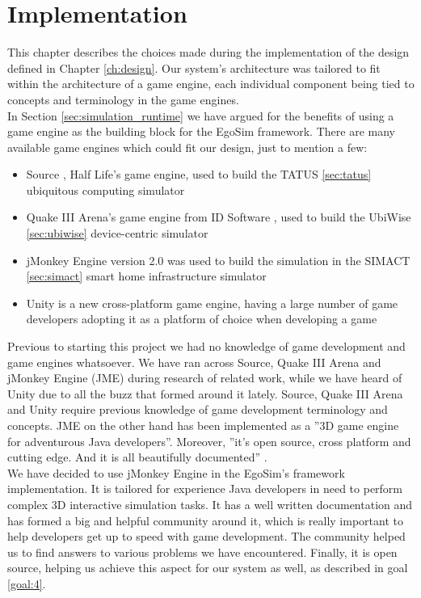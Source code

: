 \chapter{Implementation}\label{ch:implementation}
This chapter describes the choices made during the implementation of the design defined in Chapter \ref{ch:design}. Our system's architecture was tailored to fit within the architecture of a game engine, each individual component being tied to concepts and terminology in the game engines.\\ 

In Section \ref{sec:simulation_runtime} we have argued for the benefits of using a game engine as the building block for the EgoSim framework. There are many available game engines which could fit our design, just to mention a few:
\begin{itemize}
	\item Source \cite{valvesrc:online}, Half Life's game engine, used to build the TATUS \ref{sec:tatus} ubiquitous computing simulator
	\item Quake III Arena's game engine from ID Software \cite{q3a:online}, used to build the UbiWise \ref{sec:ubiwise} device-centric simulator
	\item jMonkey Engine version 2.0 \cite{jme:online} was used to build the simulation in the SIMACT \ref{sec:simact} smart home infrastructure simulator
	\item Unity \cite{unity:online} is a new cross-platform game engine, having a large number of game developers adopting it as a platform of choice when developing a game
\end{itemize}

Previous to starting this project we had no knowledge of game development and game engines whatsoever. We have ran across Source, Quake III Arena and jMonkey Engine (JME) during research of related work, while we have heard of Unity due to all the buzz that formed around it lately. Source, Quake III Arena and Unity require previous knowledge of game development terminology and concepts. JME on the other hand has been implemented as a ''3D game engine for adventurous Java developers''. Moreover, ''it's open source, cross platform and cutting edge. And it is all beautifully documented'' \cite{jme:online}.\\

We have decided to use jMonkey Engine in the EgoSim's framework implementation. It is tailored for experience Java developers in need to perform complex 3D interactive simulation tasks. It has a well written documentation and has formed a big and helpful community around it, which is really important to help developers get up to speed with game development. The community helped us to find answers to various problems we have encountered. Finally, it is open source, helping us achieve this aspect for our system as well, as described in goal \ref{goal:4}.\\

